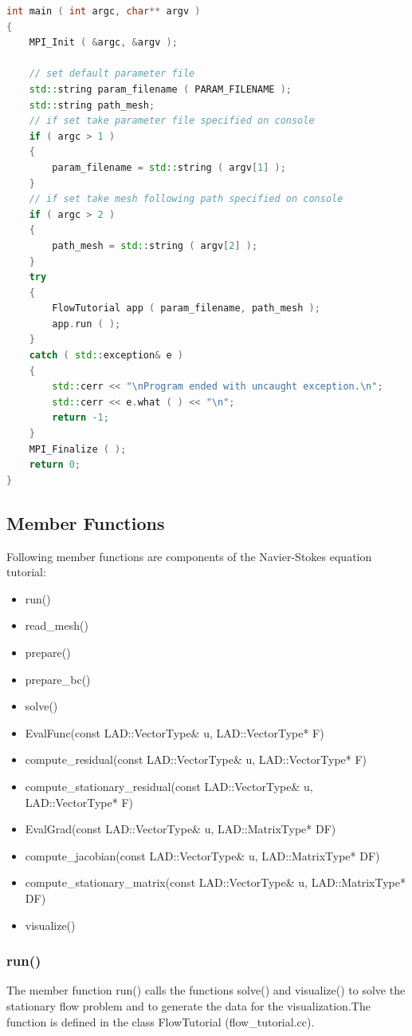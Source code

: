 \documentclass[a4paper, 11pt, twoside]{article}
\begin{document}
\begin{lstlisting}[language=C++, basicstyle={\footnotesize, \ttfamily}, keywordstyle=\color{blue},  numbers=none, tabsize=4]
int main ( int argc, char** argv )
{
    MPI_Init ( &argc, &argv );

    // set default parameter file
    std::string param_filename ( PARAM_FILENAME );
    std::string path_mesh;
    // if set take parameter file specified on console
    if ( argc > 1 )
    {
        param_filename = std::string ( argv[1] );
    }
    // if set take mesh following path specified on console
    if ( argc > 2 )
    {
        path_mesh = std::string ( argv[2] );
    }
    try
    {
        FlowTutorial app ( param_filename, path_mesh );
        app.run ( );
    }
    catch ( std::exception& e )
    {
        std::cerr << "\nProgram ended with uncaught exception.\n";
        std::cerr << e.what ( ) << "\n";
        return -1;
    }
    MPI_Finalize ( );
    return 0;
}
\end{lstlisting}

\subsection{Member Functions}
Following member functions are components of the Navier-Stokes equation tutorial: 
\begin{itemize}
 \item run()
 \item read\_mesh()
 \item prepare()
 \item prepare\_bc()
 \item solve()
 \item EvalFunc(const LAD::VectorType\& u, LAD::VectorType* F)
 \item compute\_residual(const LAD::VectorType\& u, LAD::VectorType* F)
 \item compute\_stationary\_residual(const LAD::VectorType\& u, LAD::VectorType* F)
 \item EvalGrad(const LAD::VectorType\& u, LAD::MatrixType* DF)
 \item compute\_jacobian(const LAD::VectorType\& u, LAD::MatrixType* DF)
 \item compute\_stationary\_matrix(const LAD::VectorType\& u, LAD::MatrixType* DF)
 \item visualize()
\end{itemize}

\subsubsection{run()}\label{run}
The member function run() calls the functions solve() and visualize() to solve the stationary flow problem and to generate the  data for the visualization.The function is defined in the class FlowTutorial (flow\_tutorial.cc).
\end{document}

